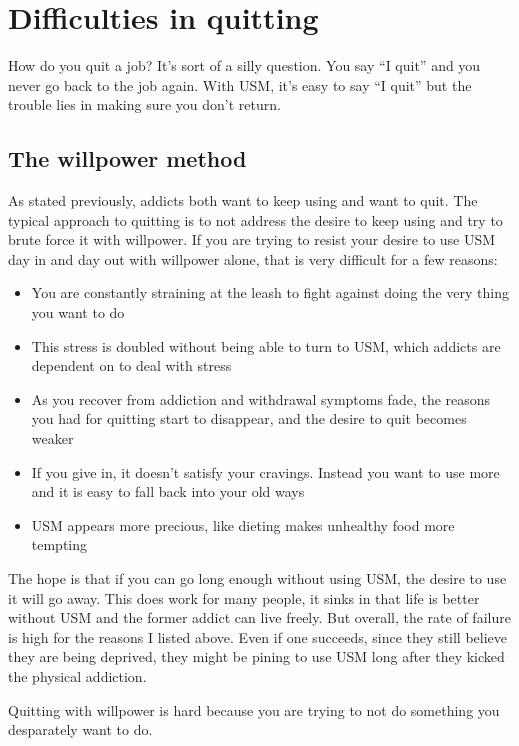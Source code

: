 \documentclass[
  openany]{book}
\providecommand{\tightlist}{%
  \setlength{\itemsep}{0pt}\setlength{\parskip}{0pt}}
\newenvironment{rmdnote}{
\color{blue}
\begin{framed}}{\end{framed}}
\begin{document}
\chapter{Difficulties in quitting}\label{difficulties-in-quitting}

How do you quit a job? It's sort of a silly question. You say ``I quit'' and you never go back to the job again. With USM, it's easy to say ``I quit'' but the trouble lies in making sure you don't return.

\section{The willpower method}\label{the-willpower-method}

As stated previously, addicts both want to keep using and want to quit. The typical approach to quitting is to not address the desire to keep using and try to brute force it with willpower. If you are trying to resist your desire to use USM day in and day out with willpower alone, that is very difficult for a few reasons:

\begin{itemize}
\tightlist
\item
  You are constantly straining at the leash to fight against doing the very thing you want to do
\item
  This stress is doubled without being able to turn to USM, which addicts are dependent on to deal with stress
\item
  As you recover from addiction and withdrawal symptoms fade, the reasons you had for quitting start to disappear, and the desire to quit becomes weaker
\item
  If you give in, it doesn't satisfy your cravings. Instead you want to use more and it is easy to fall back into your old ways
\item
  USM appears more precious, like dieting makes unhealthy food more tempting
\end{itemize}

The hope is that if you can go long enough without using USM, the desire to use it will go away. This does work for many people, it sinks in that life is better without USM and the former addict can live freely. But overall, the rate of failure is high for the reasons I listed above. Even if one succeeds, since they still believe they are being deprived, they might be pining to use USM long after they kicked the physical addiction.

\begin{rmdnote}
Quitting with willpower is hard because you are trying to not do something you desparately want to do.

\end{rmdnote}
\end{document}

